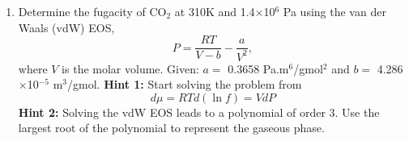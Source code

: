 \documentclass[12pts,a4paper,amsmath,amssymb,floatfix]{article}%
\newcommand{\frc}{\displaystyle\frac}
\begin{document}
\begin{enumerate}[label=\bfseries Example \arabic*]
\item\label{Example:3} Determine the fugacity of CO$_{2}$ at 310K and 1.4$\times$10$^{6}$ Pa using the van der Waals (vdW) EOS,
       \begin{displaymath}
          P = \frc{RT}{V-b} - \frc{a}{V^{2}},
       \end{displaymath}
where $V$ is the molar volume. Given: $a=$ 0.3658 Pa.m$^{6}$/gmol$^{2}$ and $b=$ 4.286$\times$10$^{-5}$ m$^{3}$/gmol. 
{\bf Hint 1:} Start solving the problem from 
      \begin{displaymath}
           d\mu = RTd\left(\ln f\right) = VdP
      \end{displaymath}
{\bf Hint 2:} Solving the vdW EOS leads to a polynomial of order 3. Use the largest root of the polynomial to represent the gaseous phase.

\bigskip


\end{enumerate}
\end{document}
